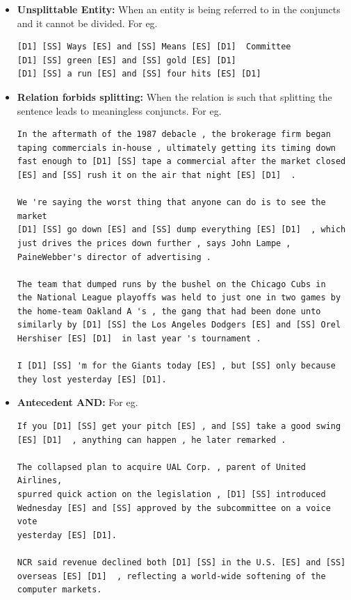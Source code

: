     \begin{itemize}
        \item \textbf{Unsplittable Entity:} When an entity is being referred to in the conjuncts and it cannot be divided. For eg.
        \begin{verbatim}
[D1] [SS] Ways [ES] and [SS] Means [ES] [D1]  Committee
[D1] [SS] green [ES] and [SS] gold [ES] [D1] 
[D1] [SS] a run [ES] and [SS] four hits [ES] [D1]
        \end{verbatim}
        
        \item \textbf{Relation forbids splitting:} When the relation is such that splitting the sentence leads to meaningless conjuncts. For eg.
        \begin{verbatim}
In the aftermath of the 1987 debacle , the brokerage firm began
taping commercials in-house , ultimately getting its timing down
fast enough to [D1] [SS] tape a commercial after the market closed
[ES] and [SS] rush it on the air that night [ES] [D1]  .

We 're saying the worst thing that anyone can do is to see the market
[D1] [SS] go down [ES] and [SS] dump everything [ES] [D1]  , which
just drives the prices down further , says John Lampe , 
PaineWebber's director of advertising .

The team that dumped runs by the bushel on the Chicago Cubs in 
the National League playoffs was held to just one in two games by 
the home-team Oakland A 's , the gang that had been done unto 
similarly by [D1] [SS] the Los Angeles Dodgers [ES] and [SS] Orel
Hershiser [ES] [D1]  in last year 's tournament .

I [D1] [SS] 'm for the Giants today [ES] , but [SS] only because 
they lost yesterday [ES] [D1].            
        \end{verbatim}

        \item \textbf{Antecedent AND:} For eg.
        \begin{verbatim}
If you [D1] [SS] get your pitch [ES] , and [SS] take a good swing 
[ES] [D1]  , anything can happen , he later remarked .

The collapsed plan to acquire UAL Corp. , parent of United Airlines, 
spurred quick action on the legislation , [D1] [SS] introduced 
Wednesday [ES] and [SS] approved by the subcommittee on a voice vote 
yesterday [ES] [D1].

NCR said revenue declined both [D1] [SS] in the U.S. [ES] and [SS]
overseas [ES] [D1]  , reflecting a world-wide softening of the 
computer markets.
        \end{verbatim}


\end{itemize}
